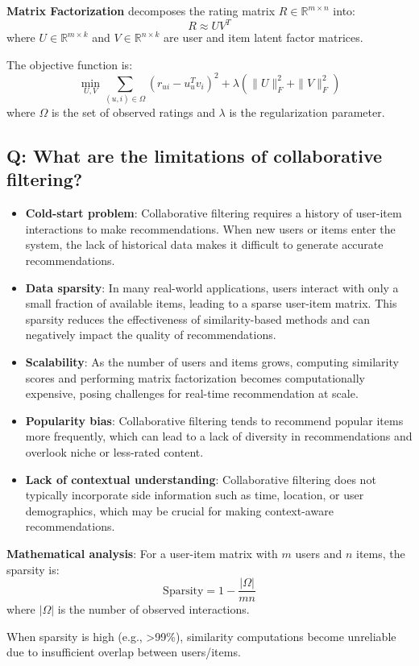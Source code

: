 \textbf{Matrix Factorization} decomposes the rating matrix \(R \in \mathbb{R}^{m \times n}\) into:
\[
R \approx UV^T
\]
where \(U \in \mathbb{R}^{m \times k}\) and \(V \in \mathbb{R}^{n \times k}\) are user and item latent factor matrices.

The objective function is:
\[
\min_{U, V} \sum_{(u,i) \in \Omega} (r_{ui} - u_u^T v_i)^2 + \lambda(\|U\|_F^2 + \|V\|_F^2)
\]
where \(\Omega\) is the set of observed ratings and \(\lambda\) is the regularization parameter.

\subsection*{Q: What are the limitations of collaborative filtering?}
\begin{itemize}
	\item \textbf{Cold-start problem}: Collaborative filtering requires a history of user-item interactions to make recommendations. When new users or items enter the system, the lack of historical data makes it difficult to generate accurate recommendations.
	\item \textbf{Data sparsity}: In many real-world applications, users interact with only a small fraction of available items, leading to a sparse user-item matrix. This sparsity reduces the effectiveness of similarity-based methods and can negatively impact the quality of recommendations.
	\item \textbf{Scalability}: As the number of users and items grows, computing similarity scores and performing matrix factorization becomes computationally expensive, posing challenges for real-time recommendation at scale.
	\item \textbf{Popularity bias}: Collaborative filtering tends to recommend popular items more frequently, which can lead to a lack of diversity in recommendations and overlook niche or less-rated content.
	\item \textbf{Lack of contextual understanding}: Collaborative filtering does not typically incorporate side information such as time, location, or user demographics, which may be crucial for making context-aware recommendations.
\end{itemize}

\textbf{Mathematical analysis}:
For a user-item matrix with \(m\) users and \(n\) items, the sparsity is:
\[
\text{Sparsity} = 1 - \frac{|\Omega|}{mn}
\]
where \(|\Omega|\) is the number of observed interactions.

When sparsity is high (e.g., >99\%), similarity computations become unreliable due to insufficient overlap between users/items.

